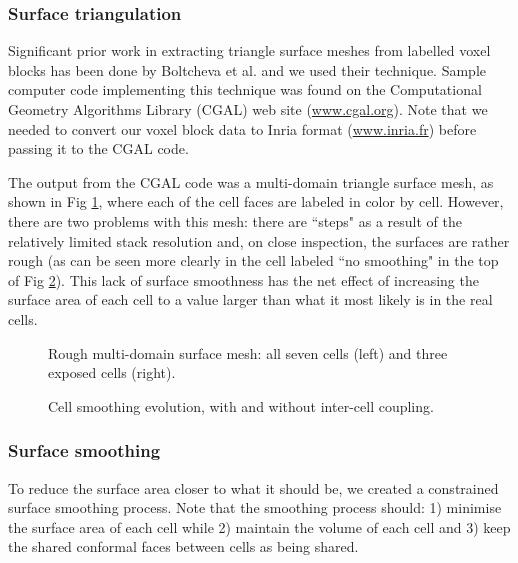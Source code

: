 \documentclass[10pt,letterpaper]{article}
\begin{document}
\subsubsection*{Surface triangulation}

Significant prior work in extracting triangle surface meshes from labelled voxel blocks has been done by Boltcheva et al.\cite{boltcheva:inria-00420228} and we used their technique. Sample computer code implementing this technique was found on the Computational Geometry Algorithms Library (CGAL) web site (\url{www.cgal.org}). Note that we needed to convert our voxel block data to Inria format (\url{www.inria.fr}) before passing it to the CGAL code.

The output from the CGAL code was a multi-domain triangle surface mesh, as shown in Fig \ref{fig:rough}, where each of the cell faces are labeled in color by cell. However, there are two problems with this mesh: there are ``steps" as a result of the relatively limited stack resolution and, on close inspection, the surfaces are rather rough (as can be seen more clearly in the cell labeled ``no smoothing" in the top of Fig \ref{fig:cell_morph}). This lack of surface smoothness has the net effect of increasing the surface area of each cell to a value larger than what it most likely is in the real cells.\\

\begin{figure}[h!]
\caption{Rough multi-domain surface mesh: all seven cells (left) and three exposed cells (right).}
\label{fig:rough}
\end{figure}

\begin{figure}[h!]
\caption{Cell smoothing evolution, with and without inter-cell coupling.}
\label{fig:cell_morph}
\end{figure}

\subsubsection*{Surface smoothing}

To reduce the surface area closer to what it should be, we created a constrained surface smoothing process. Note that the smoothing process should: 1) minimise the surface area of each cell while 2) maintain the volume of each cell and 3) keep the shared conformal faces between cells as being shared.\\
\end{document}

